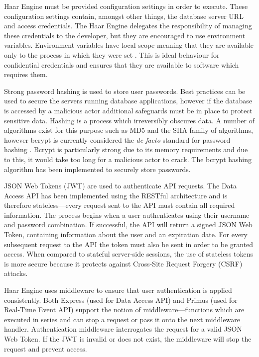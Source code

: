       Haar Engine must be provided configuration settings in order to execute. These configuration settings contain, amongst other things, the database server URL and access credentials. The Haar Engine delegates the responsibility of managing these credentials to the developer, but they are encouraged to use environment variables. Environment variables have local scope meaning that they are available only to the process in which they were set \citet{env-vars}. This is ideal behaviour for confidential credentials and ensures that they are available to software which requires them.

      Strong password hashing is used to store user passwords. Best practices can be used to secure the servers running database applications, however if the database is accessed by a malicious actor additional safeguards must be in place to protect sensitive data. Hashing is a process which irreversibly obscures data. A number of algorithms exist for this purpose such as MD5 and the SHA family of algorithms, however bcrypt is currently considered the \textit{de facto} standard for password hashing \citet{hashing-algorithms}. Bcrypt is particularly strong due to its memory requirements and due to this, it would take too long for a malicious actor to crack. The bcrypt hashing algorithm has been implemented to securely store passwords.

      JSON Web Tokens (JWT) are used to authenticate API requests. The Data Access API has been implemented using the RESTful architecture and is therefore stateless---every request sent to the API must contain all required information. The process begins when a user authenticates using their username and password combination. If successful, the API will return a signed JSON Web Token, containing information about the user and an expiration date. For every subsequent request to the API the token must also be sent in order to be granted access. When compared to stateful server-side sessions, the use of stateless tokens is more secure because it protects against Cross-Site Request Forgery (CSRF) attacks.

      Haar Engine uses middleware to ensure that user authentication is applied consistently. Both Express (used for Data Access API) and Primus (used for Real-Time Event API) support the notion of middleware---functions which are executed in series and can stop a request or pass it onto the next middleware handler. Authentication middleware interrogates the request for a valid JSON Web Token. If the JWT is invalid or does not exist, the middleware will stop the request and prevent access.


